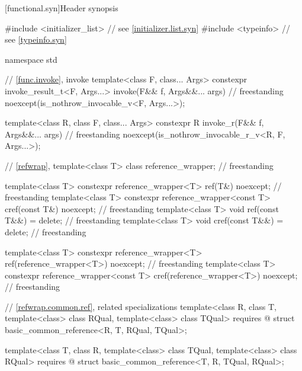 [functional.syn]{Header  synopsis}

%
%
%
\begin{codeblock}
#include <initializer_list>     // see \ref{initializer.list.syn}
#include <typeinfo>             // see \ref{typeinfo.syn}

namespace std {
  // \ref{func.invoke}, invoke
  template<class F, class... Args>
    constexpr invoke_result_t<F, Args...> invoke(F&& f, Args&&... args)             // freestanding
      noexcept(is_nothrow_invocable_v<F, Args...>);

  template<class R, class F, class... Args>
    constexpr R invoke_r(F&& f, Args&&... args)                                     // freestanding
      noexcept(is_nothrow_invocable_r_v<R, F, Args...>);

  // \ref{refwrap}, 
  template<class T> class reference_wrapper;                                        // freestanding

  template<class T> constexpr reference_wrapper<T> ref(T&) noexcept;                // freestanding
  template<class T> constexpr reference_wrapper<const T> cref(const T&) noexcept;   // freestanding
  template<class T> void ref(const T&&) = delete;                                   // freestanding
  template<class T> void cref(const T&&) = delete;                                  // freestanding

  template<class T>
    constexpr reference_wrapper<T> ref(reference_wrapper<T>) noexcept;              // freestanding
  template<class T>
    constexpr reference_wrapper<const T> cref(reference_wrapper<T>) noexcept;       // freestanding

  // \ref{refwrap.common.ref},  related specializations
  template<class R, class T, template<class> class RQual, template<class> class TQual>
    requires @\seebelow@
  struct basic_common_reference<R, T, RQual, TQual>;

  template<class T, class R, template<class> class TQual, template<class> class RQual>
    requires @\seebelow@
  struct basic_common_reference<T, R, TQual, RQual>;

}
\end{codeblock}
